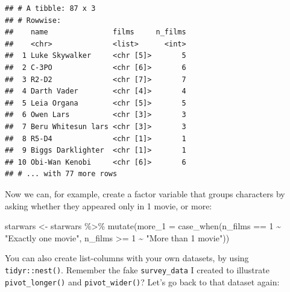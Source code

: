 \documentclass[
]{article}
\newenvironment{Shaded}{\begin{snugshade}}{\end{snugshade}}
\newcommand{\AttributeTok}[1]{\textcolor[rgb]{0.77,0.63,0.00}{#1}}
\newcommand{\DecValTok}[1]{\textcolor[rgb]{0.00,0.00,0.81}{#1}}
\newcommand{\FunctionTok}[1]{\textcolor[rgb]{0.00,0.00,0.00}{#1}}
\newcommand{\NormalTok}[1]{#1}
\newcommand{\OtherTok}[1]{\textcolor[rgb]{0.56,0.35,0.01}{#1}}
\newcommand{\SpecialCharTok}[1]{\textcolor[rgb]{0.00,0.00,0.00}{#1}}
\newcommand{\StringTok}[1]{\textcolor[rgb]{0.31,0.60,0.02}{#1}}
\begin{document}
\begin{verbatim}
## # A tibble: 87 x 3
## # Rowwise: 
##    name               films     n_films
##    <chr>              <list>      <int>
##  1 Luke Skywalker     <chr [5]>       5
##  2 C-3PO              <chr [6]>       6
##  3 R2-D2              <chr [7]>       7
##  4 Darth Vader        <chr [4]>       4
##  5 Leia Organa        <chr [5]>       5
##  6 Owen Lars          <chr [3]>       3
##  7 Beru Whitesun lars <chr [3]>       3
##  8 R5-D4              <chr [1]>       1
##  9 Biggs Darklighter  <chr [1]>       1
## 10 Obi-Wan Kenobi     <chr [6]>       6
## # ... with 77 more rows
\end{verbatim}

Now we can, for example, create a factor variable that groups characters by asking whether they appeared only in
1 movie, or more:

\begin{Shaded}
\begin{Highlighting}[]
\NormalTok{starwars }\OtherTok{\textless{}{-}}\NormalTok{ starwars }\SpecialCharTok{\%\textgreater{}\%}
  \FunctionTok{mutate}\NormalTok{(}\AttributeTok{more\_1 =} \FunctionTok{case\_when}\NormalTok{(n\_films }\SpecialCharTok{==} \DecValTok{1} \SpecialCharTok{\textasciitilde{}} \StringTok{"Exactly one movie"}\NormalTok{,}
\NormalTok{                            n\_films }\SpecialCharTok{\textgreater{}=} \DecValTok{1} \SpecialCharTok{\textasciitilde{}} \StringTok{"More than 1 movie"}\NormalTok{))}
\end{Highlighting}
\end{Shaded}

You can also create list-columns with your own datasets, by using \texttt{tidyr::nest()}. Remember the
fake \texttt{survey\_data} I created to illustrate \texttt{pivot\_longer()} and \texttt{pivot\_wider()}? Let's go back to that dataset
again:
\end{document}
